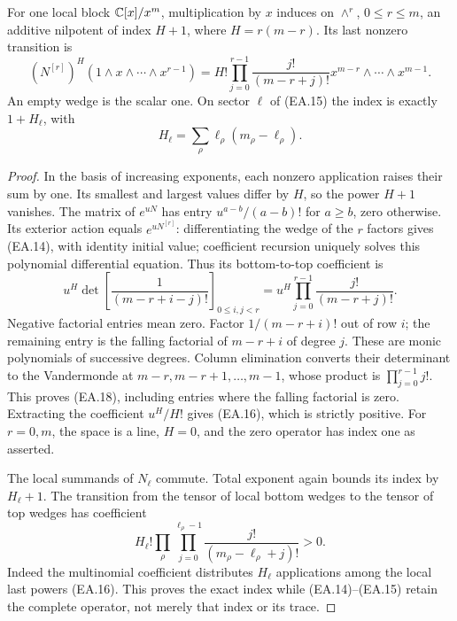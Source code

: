 \begin{theorem}
For one local block \(\mathbb C[x]/x^m\), multiplication by \(x\) induces
on \(\wedge^r\), \(0\le r\le m\), an additive nilpotent of index
\(H+1\), where \(H=r(m-r)\).  Its last nonzero transition is
\[
 (N^{[r]})^H(1\wedge x\wedge\cdots\wedge x^{r-1})
 =H!\prod_{j=0}^{r-1}\frac{j!}{(m-r+j)!}
            x^{m-r}\wedge\cdots\wedge x^{m-1}.
 \tag{EA.16}
\]
An empty wedge is the scalar one.  On sector \(\ell\) of (EA.15)
the index is exactly \(1+H_\ell\), with
\[
 H_\ell=\sum_\rho\ell_\rho(m_\rho-\ell_\rho).
 \tag{EA.17}
\]
\end{theorem}
\begin{proof}
In the basis of increasing exponents, each nonzero application raises
their sum by one.  Its smallest and largest values differ by \(H\),
so the power \(H+1\) vanishes.  The matrix of \(e^{uN}\) has
entry \(u^{a-b}/(a-b)!\) for \(a\ge b\), zero otherwise.
Its exterior action equals \(e^{uN^{[r]}}\): differentiating the wedge
of the \(r\) factors gives (EA.14), with identity initial value;
coefficient recursion uniquely solves this polynomial differential
equation.  Thus its bottom-to-top coefficient is
\[
 u^H\det\left[\frac1{(m-r+i-j)!}\right]_{0\le i,j<r}
 =u^H\prod_{j=0}^{r-1}\frac{j!}{(m-r+j)!}.
 \tag{EA.18}
\]
Negative factorial entries mean zero.  Factor \(1/(m-r+i)!\)
out of row \(i\); the remaining entry is the falling factorial
of \(m-r+i\) of degree \(j\).  These are monic polynomials of
successive degrees.  Column elimination converts their determinant to
the Vandermonde at \(m-r,m-r+1,\ldots,m-1\), whose product is
\(\prod_{j=0}^{r-1}j!\).  This proves (EA.18), including entries
where the falling factorial is zero.  Extracting the coefficient
\(u^H/H!\) gives (EA.16), which is strictly positive.  For
\(r=0,m\), the space is a line, \(H=0\), and the zero
operator has index one as asserted.

The local summands of \(N_\ell\) commute.  Total exponent again
bounds its index by \(H_\ell+1\).  The transition from the tensor
of local bottom wedges to the tensor of top wedges has coefficient
\[
 H_\ell!\prod_\rho\prod_{j=0}^{\ell_\rho-1}
                   \frac{j!}{(m_\rho-\ell_\rho+j)!}>0.
 \tag{EA.19}
\]
Indeed the multinomial coefficient distributes \(H_\ell\)
applications among the local last powers (EA.16).  This proves the
exact index while (EA.14)--(EA.15) retain the complete operator, not
merely that index or its trace.
\end{proof}


